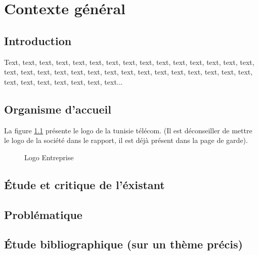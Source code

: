 \chapter{Contexte général}
\section*{Introduction}
Text, text, text, text, text, text, text, text, text, text, text, text, text, text, text, text, text, text, text, text, text, text, text, text, text, text, text, text, text, text, text, text, text, text, text, text, text...


\section[Organisme d'accueil]{Organisme d'accueil \cite{webArticle1}}

La figure \ref{fig:logo_tt} présente le logo de la tunisie télécom. (Il est déconseiller de mettre le logo de la société dans le rapport, il est déjà présent dans la page de garde).

\begin{figure}[htpb]
\centering
{}
\caption{Logo Entreprise}
\label{fig:logo_tt}
\end{figure}

\section{\'Etude et critique de l'éxistant}

\section{Problématique}

\section{\'Etude bibliographique (sur un thème précis)}


